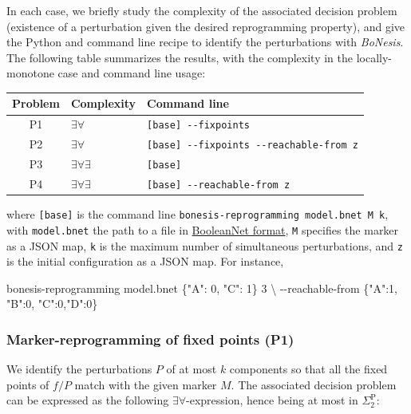 \documentclass[PCJ,Unicode,screen,mode=plain]{cedram}
\newenvironment{Shaded}{}{}
\newcommand{\DataTypeTok}[1]{\textcolor[rgb]{0.56,0.13,0.00}{{#1}}}
\newcommand{\StringTok}[1]{\textcolor[rgb]{0.25,0.44,0.63}{{#1}}}
\newcommand{\NormalTok}[1]{{#1}}
\newcommand{\ExtensionTok}[1]{{#1}}
\newcommand{\AttributeTok}[1]{\textcolor[rgb]{0.49,0.56,0.16}{{#1}}}
\begin{document}
In each case, we briefly study the complexity of the associated decision
problem (existence of a perturbation given the desired reprogramming
property), and give the Python and command line recipe to identify the
perturbations with \emph{BoNesis}. The following table summarizes the
results, with the complexity in the locally-monotone case and command
line usage:

\begin{longtable}[]{@{}cll@{}}
\toprule()
Problem & Complexity & Command line \\
\midrule()
\endhead
P1 & \(\exists\forall\) & \texttt{{[}base{]}\ -\/-fixpoints} \\
P2 & \(\exists\forall\) &
\texttt{{[}base{]}\ -\/-fixpoints\ -\/-reachable-from\ z} \\
P3 & \(\exists\forall\exists\) & \texttt{{[}base{]}} \\
P4 & \(\exists\forall\exists\) &
\texttt{{[}base{]}\ -\/-reachable-from\ z} \\
\bottomrule()
\end{longtable}

where \texttt{{[}base{]}} is the command line
\texttt{bonesis-reprogramming\ model.bnet\ M\ k}, with
\texttt{model.bnet} the path to a file in
\href{http://colomoto.org/biolqm/doc/format-bnet.html}{BooleanNet
format}, \texttt{M} specifies the marker as a JSON map, \texttt{k} is
the maximum number of simultaneous perturbations, and \texttt{z} is the
initial configuration as a JSON map. For instance,

\begin{Shaded}
\begin{Highlighting}[]
\ExtensionTok{bonesis{-}reprogramming}\NormalTok{ model.bnet }\StringTok{\textquotesingle{}\{"A": 0, "C": 1\}\textquotesingle{}}\NormalTok{ 3 }\DataTypeTok{\textbackslash{}}
        \AttributeTok{{-}{-}reachable{-}from} \StringTok{\textquotesingle{}\{"A":1, "B":0, "C":0,"D":0\}\textquotesingle{}}
\end{Highlighting}
\end{Shaded}
\hypertarget{marker-reprogramming-of-fixed-points-p1}{%
\subsubsection{Marker-reprogramming of fixed points
(P1)}\label{marker-reprogramming-of-fixed-points-p1}}

We identify the perturbations \(P\) of at most \(k\) components so that
all the fixed points of \(f/P\) match with the given marker \(M\). The
associated decision problem can be expressed as the following
\(\exists\forall\)-expression, hence being at most in
\(\Sigma_2^{\mathrm P}\):
\end{document}
